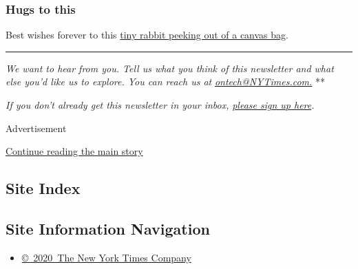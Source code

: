\hypertarget{hugs-to-this}{%
\subsubsection{Hugs to this}\label{hugs-to-this}}

Best wishes forever to this
\href{https://www.tiktok.com/@carrot.castle/video/6847954959464434949}{tiny
rabbit peeking out of a canvas bag}.

\begin{center}\rule{0.5\linewidth}{\linethickness}\end{center}

\emph{We want to hear from you. Tell us what you think of this
newsletter and what else you'd like us to explore. You can reach us at}
\href{mailto:ontech@NYTimes.com?subject=On\%20Tech\%20Feedback}{\emph{ontech@NYTimes.com.}}
**

\emph{If you don't already get this newsletter in your inbox,}
\href{https://www.nytimes3xbfgragh.onion/newsletters/signup/OT}{\emph{please
sign up here}}\emph{.}

Advertisement

\protect\hyperlink{after-bottom}{Continue reading the main story}

\hypertarget{site-index}{%
\subsection{Site Index}\label{site-index}}

\hypertarget{site-information-navigation}{%
\subsection{Site Information
Navigation}\label{site-information-navigation}}

\begin{itemize}
\tightlist
\item
  \href{https://help.nytimes3xbfgragh.onion/hc/en-us/articles/115014792127-Copyright-notice}{©~2020~The
  New York Times Company}
\end{itemize}

